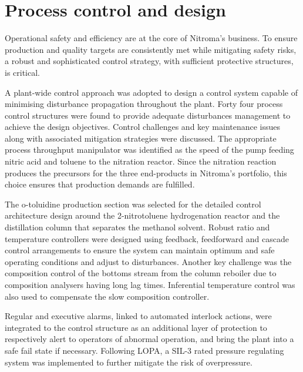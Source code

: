 \section*{Process control and design}

Operational safety and efficiency are at the core of Nitroma's business. To ensure production and quality targets are consistently met while mitigating safety risks, a robust and sophisticated control strategy, with sufficient protective structures, is critical.

A plant-wide control approach was adopted to design a control system capable of minimising disturbance propagation throughout the plant. Forty four process control structures were found to provide adequate disturbances management to achieve the design objectives. Control challenges and key maintenance issues along with associated mitigation strategies were discussed. The appropriate process throughput manipulator was identified as the speed of the pump feeding nitric acid and toluene to the nitration reactor. Since the nitration reaction produces the precursors for the three end-products in Nitroma's portfolio, this choice ensures that production demands are fulfilled.    

The o-toluidine production section was selected for the detailed control architecture design around the 2-nitrotoluene hydrogenation reactor and the distillation column that separates the methanol solvent. Robust ratio and temperature controllers were designed using feedback, feedforward and cascade control arrangements to ensure the system can maintain optimum and safe operating conditions and adjust to disturbances. Another key challenge was the composition control of the bottoms stream from the column reboiler due to composition analysers having long lag times. Inferential temperature control was also used to compensate the slow composition controller. 

Regular and executive alarms, linked to automated interlock actions, were integrated to the control structure as an additional layer of protection to respectively alert to operators of abnormal operation, and bring the plant into a safe fail state if necessary. Following LOPA, a SIL-3 rated pressure regulating system was implemented to further mitigate the risk of overpressure.




